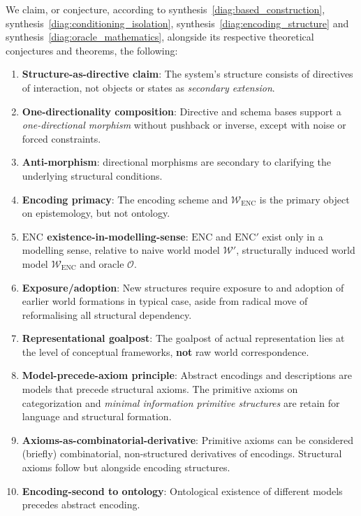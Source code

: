 \begin{conjecture}
	We claim, or conjecture, according to synthesis~\ref{diag:based_construction}, synthesis~\ref{diag:conditioning_isolation}, synthesis~\ref{diag:encoding_structure} and synthesis~\ref{diag:oracle_mathematics}, alongside its respective theoretical conjectures and theorems, the following:
	\begin{enumerate}[leftmargin=0.5cm,itemsep=1pt,topsep=1pt]
		\item \textbf{Structure-as-directive claim}: The system's structure consists of directives of interaction, not objects or states as \textit{secondary extension}. 
		\item \textbf{One-directionality composition}: Directive and schema bases support a \textit{one-directional morphism} without pushback or inverse, except with noise or forced constraints. 
		\item \textbf{Anti-morphism}: directional morphisms are secondary to clarifying the underlying structural conditions. 
		\item \textbf{Encoding primacy}: The encoding scheme and $\mathcal{W}_{\mathrm{ENC}}$ is the primary object on epistemology, but not ontology. 
		\item \textbf{$\mathrm{ENC}$ existence-in-modelling-sense}: $\mathrm{ENC}$ and $\mathrm{ENC}'$ exist only in a modelling sense, relative to naive world model $\mathcal{W}'$, structurally induced world model $\mathcal{W}_{\mathrm{ENC}}$ and oracle $\mathcal{O}$. 
		\item \textbf{Exposure/adoption}: New structures require exposure to and adoption of earlier world formations in typical case, aside from radical move of reformalising all structural dependency. 
		\item \textbf{Representational goalpost}: The goalpost of actual representation lies at the level of conceptual frameworks, \textbf{not} raw world correspondence.
		\item \textbf{Model-precede-axiom principle}: Abstract encodings and descriptions are models that precede structural axioms. The primitive axioms on categorization and \textit{minimal information primitive structures} are retain for language and structural formation. 
		\item \textbf{Axioms-as-combinatorial-derivative}: Primitive axioms can be considered (briefly) combinatorial, non-structured derivatives of encodings. Structural axioms follow but alongside encoding structures. 
		\item \textbf{Encoding-second to ontology}: Ontological existence of different models precedes abstract encoding. 

\end{enumerate}
\end{conjecture}
